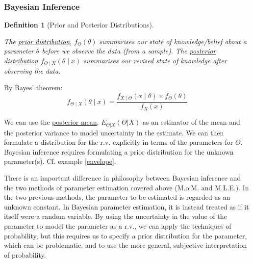 \documentclass[12pt,a4paper]{article}
\newtheorem{defn}[thm]{Definition}
\begin{document}
\subsubsection{Bayesian Inference}

\begin{defn}[Prior and Posterior Distributions]$\;$\par\vspace{1cm}

The \underline{prior distribution}, $f_\Theta(\theta)$ summarises our state of knowledge/belief about a parameter $\theta$ before we observe the data (from a sample). The \underline{posterior distribution} $f_{\Theta \mid X}(\theta \mid x)$ summarises our revised state of knowledge after observing the data.

\end{defn}

By Bayes' theorem:
$$f_{\Theta \mid X}(\theta\mid x) = \frac{f_{X\mid\Theta}(x\mid \theta) \times f_{\Theta}(\theta)}{f_X(x)}$$

We can use the \underline{posterior mean}, $E_{\Theta|X}(\Theta | X)$ as an estimator of the mean and the posterior variance to model uncertainty in the estimate. We can then formulate a distribution for the r.v. explicitly in terms of the parameters for $\Theta$. Bayesian inference requires formulating a prior distribution for the unknown parameter(s). Cf. example \ref{envelope}.

There is an important difference in philosophy between Bayesian inference and the two methods of parameter estimation covered above (M.o.M. and M.L.E.). In the two previous methods, the parameter to be estimated is regarded as an unknown constant. In Bayesian parameter estimation, it is instead treated as if it itself were a random variable. By using the uncertainty in the value of the parameter to model the parameter as a r.v., we can apply the techniques of probability, but this requires us to specify a prior distribution for the parameter, which can be problematic, and to use the more general, subjective interpretation of probability.
\end{document}
